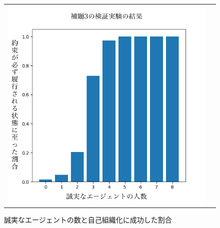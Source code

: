\begin{figure}[h]
  \begin{tabular}{cc}
    \begin{minipage}[t]{1\hsize}
      \centering
      \includegraphics[keepaspectratio, width=1\linewidth]{./07_complex-system/figure01.png}
      \caption{誠実なエージェントの数と自己組織化に成功した割合}
      \label{compex-system-002}
    \end{minipage}
  \end{tabular}
\end{figure}
